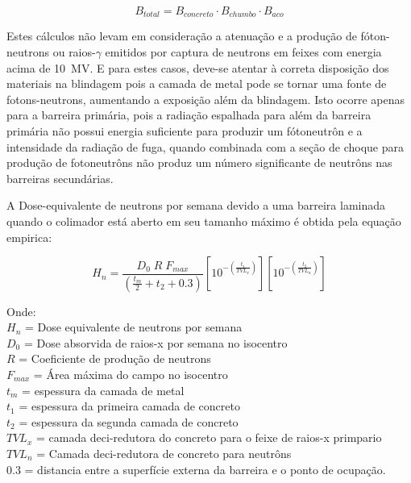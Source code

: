 \documentclass[11pt,a4paper]{article}
\begin{document}
            \begin{equation}
                B_{total} = B_{concreto} \cdot B_{chumbo} \cdot B_{aco}
            \end{equation}
            

            Estes cálculos não levam em consideração a atenuação e a produção de fóton-neutrons ou raios-$\gamma$ emitidos por captura de neutrons em feixes com energia acima de \qty{10}{MV}. E para estes casos, deve-se atentar à correta disposição dos materiais na blindagem pois a camada de metal pode se tornar uma fonte de fotons-neutrons, aumentando a exposição além da blindagem. Isto ocorre apenas para a barreira primária, pois a radiação espalhada para além da barreira primária não possui energia suficiente para produzir um fótoneutrôn e a intensidade da radiação de fuga, quando combinada com a seção de choque para produção de fotoneutrôns não produz um número significante de neutrôns nas barreiras secundárias.

            A Dose-equivalente de neutrons por semana devido a uma barreira laminada quando o colimador está aberto em seu tamanho máximo é obtida pela equação empirica:

            \begin{equation}
                H_n = \frac{D_0 \; R \; F_{max}}{\left(\frac{t_m}{2} + t_2 + 0.3\right)} 
                \left[10^{-\left(\frac{t_1}{TVL_x}\right)}\right]
                \left[10^{-\left(\frac{t_2}{TVL_n}\right)}\right]
            \end{equation}

            Onde: \\
            $H_n$ =  Dose equivalente de neutrons por semana \\
            $D_0$ =  Dose absorvida de raios-x por semana no isocentro \\
            $R$ = Coeficiente de produção de neutrons \\
            $F_{max}$ = Área máxima do campo no isocentro \\
            $t_m$ = espessura da camada de metal \\
            $t_1$ = espessura da primeira camada de concreto \\
            $t_2$ = espessura da segunda camada de concreto \\
            $TVL_x$ = camada deci-redutora do concreto para o feixe de raios-x primpario \\
            $TVL_n$ = Camada deci-redutora de concreto para neutrôns \\
            $0.3$ = distancia entre a superfície externa da barreira e o ponto de ocupação.
\end{document}
